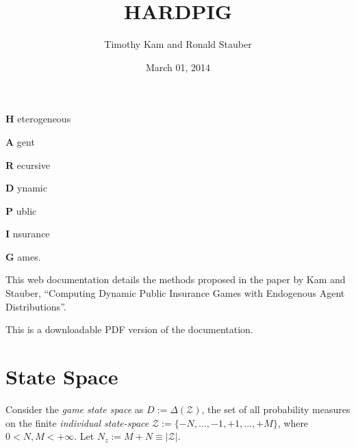 \documentclass[a4paper,10pt,english]{sphinxmanual}
\title{HARDPIG}
\date{March 01, 2014}
\author{Timothy Kam and Ronald Stauber}
\begin{document}
\maketitle
\tableofcontents
{}\label{index::doc}


\begin{DUlineblock}{0em}
\item[] \textbf{H} eterogeneous
\item[]
\begin{DUlineblock}{\DUlineblockindent}
\item[] \textbf{A} gent
\end{DUlineblock}
\item[] \textbf{R} ecursive
\item[]
\begin{DUlineblock}{\DUlineblockindent}
\item[] \textbf{D} ynamic
\end{DUlineblock}
\item[] \textbf{P} ublic
\item[]
\begin{DUlineblock}{\DUlineblockindent}
\item[] \textbf{I} nsurance
\end{DUlineblock}
\item[] \textbf{G} ames.
\item[] 
\item[] 
\end{DUlineblock}

This web documentation details the methods proposed in the paper by Kam and
Stauber, ``Computing Dynamic Public Insurance Games with Endogenous Agent
Distributions''.

This is a downloadable PDF version of the documentation.


\chapter{State Space}
\label{statespace:introduction}\label{statespace:state-space}\label{statespace::doc}
Consider the \emph{game state space} as $D := \Delta (\mathcal{Z})$, the set of
all probability measures on the finite \emph{individual state-space}
$\mathcal{Z} := \{-N,...,-1,+1,...,+M\}$, where $0<N,M <+\infty$.
Let $N_{z}:=M+N \equiv |\mathcal{Z}|$.
\end{document}
